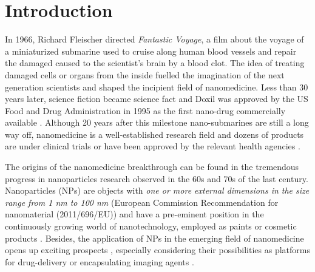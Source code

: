 \chapter{Introduction}
\label{chap:introduction}


In 1966, Richard Fleischer directed \emph{Fantastic Voyage}, a film about the voyage of a miniaturized submarine used to cruise along human blood vessels and repair the damaged caused to the scientist's brain by a blood clot. The idea of treating damaged cells or organs from the inside fuelled the imagination of the next generation scientists and shaped the incipient field of nanomedicine. Less than 30 years later, science fiction became science fact and Doxil was approved by the US Food and Drug Administration in 1995 as the first nano-drug commercially available \citep{barenholz_doxil-first_2012}. Although 20 years after this milestone nano-submarines are still a long way off, nanomedicine is a well-established research field and dozens of products are under clinical trials or have been approved by the relevant health agencies \citep{etheridge_big_2013}.

The origins of the nanomedicine breakthrough can be found in the tremendous progress in nanoparticles research observed in the 60s and 70s of the last century. Nanoparticles (NPs) are objects with \emph{one or more external dimensions in the size range from 1 nm to 100 nm} (European Commission Recommendation for nanomaterial (2011/696/EU)) and have a pre-eminent position in the continuously growing world of nanotechnology, employed as paints or cosmetic products \citep{guterres_polymeric_2007}. Besides, the application of NPs in the emerging field of nanomedicine opens up exciting prospects \citep{sahoo_nanotech_2003, wickline_nanotechnology_2003, rosen_rise_2005, nie_nanotechnology_2007,zhou_nano-enabled_2014}, especially considering their possibilities as platforms for drug-delivery \citep{wang_nanoparticle_2012} or encapsulating imaging agents \citep{tao_shape-specific_2011}.

